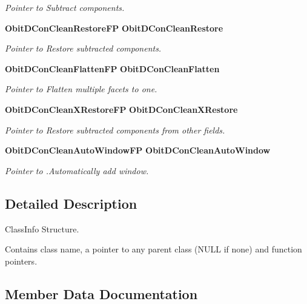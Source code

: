 \begin{CompactItemize}
\begin{CompactList}\small\item\em Pointer to Subtract components. \item\end{CompactList}\item 
{\bf Obit\-DCon\-Clean\-Restore\-FP} {\bf Obit\-DCon\-Clean\-Restore}
\begin{CompactList}\small\item\em Pointer to Restore subtracted components. \item\end{CompactList}\item 
{\bf Obit\-DCon\-Clean\-Flatten\-FP} {\bf Obit\-DCon\-Clean\-Flatten}
\begin{CompactList}\small\item\em Pointer to Flatten multiple facets to one. \item\end{CompactList}\item 
{\bf Obit\-DCon\-Clean\-XRestore\-FP} {\bf Obit\-DCon\-Clean\-XRestore}
\begin{CompactList}\small\item\em Pointer to Restore subtracted components from other fields. \item\end{CompactList}\item 
{\bf Obit\-DCon\-Clean\-Auto\-Window\-FP} {\bf Obit\-DCon\-Clean\-Auto\-Window}
\begin{CompactList}\small\item\em Pointer to .Automatically add window. \item\end{CompactList}\end{CompactItemize}


\subsection{Detailed Description}
Class\-Info Structure. 

Contains class name, a pointer to any parent class (NULL if none) and function pointers. 



\subsection{Member Data Documentation}

